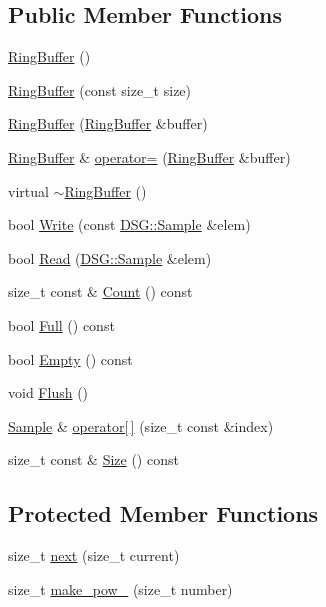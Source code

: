 \subsection*{Public Member Functions}
\begin{DoxyCompactItemize}
\item 
\hyperlink{classDSG_1_1RingBuffer_a3136c9debb3c422adb1d5835e11b2b99}{Ring\+Buffer} ()
\item 
\hyperlink{classDSG_1_1RingBuffer_ae9859fd3ad18961de494d8b50fe4763e}{Ring\+Buffer} (const size\+\_\+t size)
\item 
\hyperlink{classDSG_1_1RingBuffer_ab09f32dacee49df3281c6701b7a4d737}{Ring\+Buffer} (\hyperlink{classDSG_1_1RingBuffer}{Ring\+Buffer} \&buffer)
\item 
\hyperlink{classDSG_1_1RingBuffer}{Ring\+Buffer} \& \hyperlink{classDSG_1_1RingBuffer_a892fbcc12b2dca5b04ead96a09299e73}{operator=} (\hyperlink{classDSG_1_1RingBuffer}{Ring\+Buffer} \&buffer)
\item 
virtual \hyperlink{classDSG_1_1RingBuffer_a771d30b04b6f0313c203530685fbeb3a}{$\sim$\+Ring\+Buffer} ()
\item 
bool \hyperlink{classDSG_1_1RingBuffer_af484c16dbffaf555860a84652ac46284}{Write} (const \hyperlink{classDSG_1_1Sample}{D\+S\+G\+::\+Sample} \&elem)
\item 
bool \hyperlink{classDSG_1_1RingBuffer_ae46649acd09c2e83834f3e31157b29b6}{Read} (\hyperlink{classDSG_1_1Sample}{D\+S\+G\+::\+Sample} \&elem)
\item 
size\+\_\+t const \& \hyperlink{classDSG_1_1RingBuffer_a9bd79b0a6dff618b205e396c101ee070}{Count} () const 
\item 
bool \hyperlink{classDSG_1_1RingBuffer_a53ddb04ffcbb5470a8d2b0a3c65b70cb}{Full} () const 
\item 
bool \hyperlink{classDSG_1_1RingBuffer_ac1346f5842d08b988a5297abe4089b96}{Empty} () const 
\item 
void \hyperlink{classDSG_1_1RingBuffer_ab23c8003d2857809a816068eeb209d60}{Flush} ()
\item 
\hyperlink{classDSG_1_1Sample}{Sample} \& \hyperlink{classDSG_1_1Buffer_a5dafe5522f3d20756f83e08499e8eaeb}{operator\mbox{[}$\,$\mbox{]}} (size\+\_\+t const \&index)
\item 
size\+\_\+t const \& \hyperlink{classDSG_1_1Buffer_a4acea659d9cd0be652ec55d21e5b0262}{Size} () const 
\end{DoxyCompactItemize}
\subsection*{Protected Member Functions}
\begin{DoxyCompactItemize}
\item 
size\+\_\+t \hyperlink{classDSG_1_1RingBuffer_a6d7a76a4c9b38ccde46344662e08c9e5}{next} (size\+\_\+t current)
\item 
size\+\_\+t \hyperlink{classDSG_1_1RingBuffer_aaf481e139011e91b111cc048e726cafb}{make\+\_\+pow\+\_} (size\+\_\+t number)
\end{DoxyCompactItemize}
